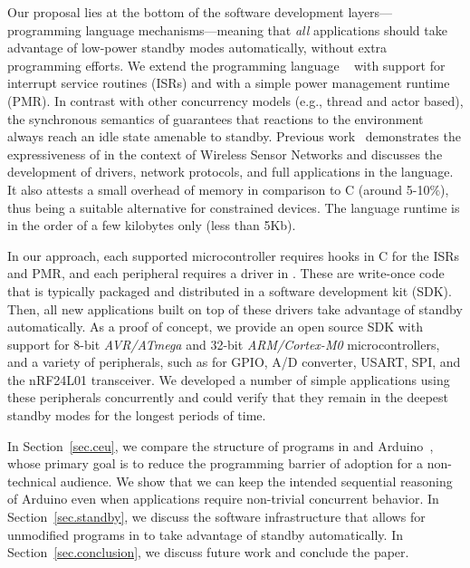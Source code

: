 Our proposal lies at the bottom of the software development
layers---programming language mechanisms---meaning that \emph{all} applications
should take advantage of low-power standby modes automatically, without extra
programming efforts.
%
We extend the programming language \CEU~\cite{ceu.sensys13,ceu.tecs17} with
support for interrupt service routines (ISRs) and with a simple power
management runtime (PMR).
%
In contrast with other concurrency models (e.g., thread and actor based), the
synchronous semantics of \CEU guarantees that reactions to the environment
always reach an idle state amenable to standby.
%
Previous work~\cite{ceu.sensys13} demonstrates the expressiveness of \CEU in
the context of Wireless Sensor Networks and discusses the development of
drivers, network protocols, and full applications in the language.
It also attests a small overhead of memory in comparison to C (around 5-10\%),
thus being a suitable alternative for constrained devices.
The language runtime is in the order of a few kilobytes only (less than 5Kb).

In our approach, each supported microcontroller requires hooks in C for the
ISRs and PMR, and each peripheral requires a driver in \CEU.
These are write-once code that is typically packaged and distributed in a
software development kit (SDK).
%
Then, all new applications built on top of these drivers take advantage of
standby automatically.
%
As a proof of concept, we provide an open source SDK %
with support for 8-bit
\emph{AVR/ATmega} and 32-bit \emph{ARM/Cortex-M0} microcontrollers, and a
variety of peripherals, such as for GPIO, A/D converter, USART, SPI, and the
nRF24L01 transceiver.
%
We developed a number of simple applications using these peripherals
concurrently and could verify that they remain in the deepest standby modes for
the longest periods of time.


In Section~\ref{sec.ceu}, we compare the structure of programs in \CEU and
Arduino~\cite{arduino.book}, whose primary goal is to reduce the programming
barrier of adoption for a non-technical audience. %
We show that we can keep the intended sequential reasoning of Arduino even when
applications require non-trivial concurrent behavior.
%
In Section~\ref{sec.standby}, we discuss the software infrastructure that
allows for unmodified programs in \CEU to take advantage of standby
automatically.
%
In Section~\ref{sec.conclusion}, we discuss future work and conclude the paper.

